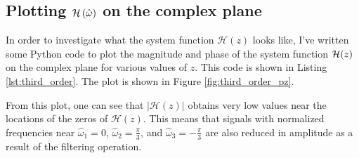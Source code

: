 \subsection{Plotting $\mathcal{H}\left(\hat{\omega}\right)$ on the complex plane}
In order to investigate what the system function $\mathcal{H}(z)$
looks like, I've written some Python code to plot the magnitude and
phase of the system function $\mathcal{H}(z)$ on the complex plane for various
values of $z$. This code is shown in Listing
\ref{lst:third_order}. The plot is shown in Figure
\ref{fig:third_order_pz}.


From this plot, one can see that $|\mathcal{H}(z)|$ obtains very low
values near the locations of the zeros of $\mathcal{H}(z)$. This means
that signals with normalized frequencies near $\hat{\omega}_1=0$,
$\hat{\omega}_2=\frac{\pi}{3}$, and $\hat{\omega}_3=-\frac{\pi}{3}$
are also reduced in amplitude as a result of the filtering operation.


